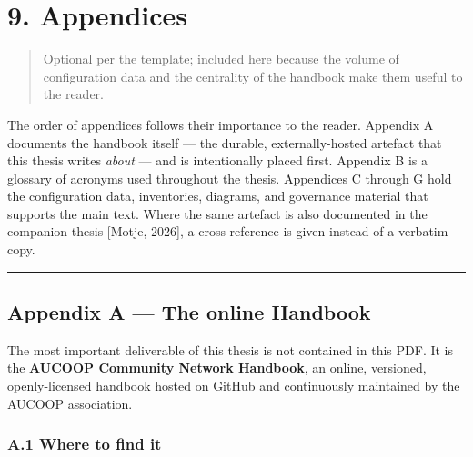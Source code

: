 \hypertarget{appendices}{%
\section{9. Appendices}\label{appendices}}

\begin{quote}
Optional per the template; included here because the volume of
configuration data and the centrality of the handbook make them useful
to the reader.
\end{quote}

The order of appendices follows their importance to the reader. Appendix
A documents the handbook itself --- the durable, externally-hosted
artefact that this thesis writes \emph{about} --- and is intentionally
placed first. Appendix B is a glossary of acronyms used throughout the
thesis. Appendices C through G hold the configuration data, inventories,
diagrams, and governance material that supports the main text. Where the
same artefact is also documented in the companion thesis {[}Motje,
2026{]}, a cross-reference is given instead of a verbatim copy.

\begin{center}\rule{0.5\linewidth}{0.5pt}\end{center}

\hypertarget{appendix-a-the-online-handbook}{%
\subsection{Appendix A --- The online
Handbook}\label{appendix-a-the-online-handbook}}

The most important deliverable of this thesis is not contained in this
PDF. It is the \textbf{AUCOOP Community Network Handbook}, an online,
versioned, openly-licensed handbook hosted on GitHub and continuously
maintained by the AUCOOP association.

\hypertarget{a.1-where-to-find-it}{%
\subsubsection{A.1 Where to find it}\label{a.1-where-to-find-it}}

